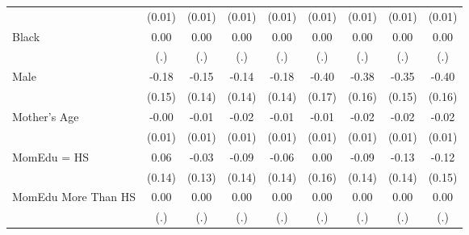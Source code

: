 {\begin{tabular}{l*{8}{c}}
                    &      (0.01)         &      (0.01)         &      (0.01)         &      (0.01)         &      (0.01)         &      (0.01)         &      (0.01)         &      (0.01)         \\
[1em]
Black               &        0.00         &        0.00         &        0.00         &        0.00         &        0.00         &        0.00         &        0.00         &        0.00         \\
                    &         (.)         &         (.)         &         (.)         &         (.)         &         (.)         &         (.)         &         (.)         &         (.)         \\
[1em]
Male                &       -0.18         &       -0.15         &       -0.14         &       -0.18         &       -0.40\sym{**} &       -0.38\sym{**} &       -0.35\sym{**} &       -0.40\sym{**} \\
                    &      (0.15)         &      (0.14)         &      (0.14)         &      (0.14)         &      (0.17)         &      (0.16)         &      (0.15)         &      (0.16)         \\
[1em]
Mother's Age        &       -0.00         &       -0.01         &       -0.02         &       -0.01         &       -0.01         &       -0.02         &       -0.02\sym{*}  &       -0.02         \\
                    &      (0.01)         &      (0.01)         &      (0.01)         &      (0.01)         &      (0.01)         &      (0.01)         &      (0.01)         &      (0.01)         \\
[1em]
MomEdu = HS         &        0.06         &       -0.03         &       -0.09         &       -0.06         &        0.00         &       -0.09         &       -0.13         &       -0.12         \\
                    &      (0.14)         &      (0.13)         &      (0.14)         &      (0.14)         &      (0.16)         &      (0.14)         &      (0.14)         &      (0.15)         \\
[1em]
MomEdu More Than HS &        0.00         &        0.00         &        0.00         &        0.00         &        0.00         &        0.00         &        0.00         &        0.00         \\
                    &         (.)         &         (.)         &         (.)         &         (.)         &         (.)         &         (.)         &         (.)         &         (.)         \\

\end{tabular}}
